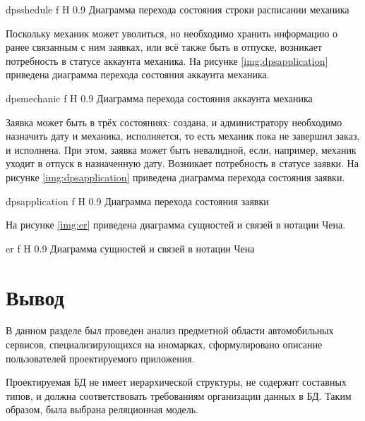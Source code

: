 {dpsshedule}
{f}
{H}
{0.9\textwidth}
{Диаграмма перехода состояния строки расписании механика}

Поскольку механик может уволиться, но необходимо хранить информацию о ранее связанным с ним заявках, или всё также быть в отпуске, возникает потребность в статусе аккаунта механика. 
На рисунке \ref{img:dpsapplication} приведена диаграмма перехода состояния аккаунта механика.

{dpsmechanic}
{f}
{H}
{0.9\textwidth}
{Диаграмма перехода состояния аккаунта механика}

Заявка может быть в трёх состояниях: создана, и администратору необходимо назначить дату и механика, исполняется, то есть механик пока не завершил заказ, и исполнена. 
При этом, заявка может быть невалидной, если, например, механик уходит в отпуск в назначенную дату.
Возникает потребность в статусе заявки.
На рисунке \ref{img:dpsapplication} приведена диаграмма перехода состояния заявки.

{dpsapplication}
{f}
{H}
{0.9\textwidth}
{Диаграмма перехода состояния заявки}

На рисунке \ref{img:er} приведена диаграмма сущностей и связей в нотации Чена.

{er}
{f}
{H}
{0.9\textwidth}
{Диаграмма сущностей и связей в нотации Чена}

\section*{Вывод}

В данном разделе был проведен анализ предметной области автомобильных сервисов, специализирующихся на иномарках, сформулировано описание пользователей проектируемого приложения.

Проектируемая БД не имеет иерархической структуры, не содержит составных типов, и должна соответствовать требованиям организации данных в БД. Таким образом, была выбрана реляционная модель.



 







